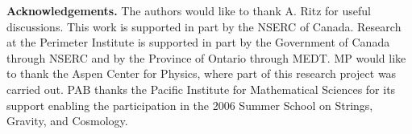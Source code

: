 \documentclass[12pt]{revtex4}
\begin{document}
{\bf Acknowledgements.} The authors would like to thank A. Ritz for useful discussions.
This work is supported in part by the NSERC of Canada. Research at the Perimeter Institute 
is supported in part by the Government
of Canada through NSERC and by the Province of Ontario through MEDT. MP would like to thank 
the Aspen Center for Physics, where part of this research project was carried out. 
PAB thanks the Pacific Institute for Mathematical Sciences for its support enabling the participation in the 2006 
Summer School on Strings, Gravity, and Cosmology.




\end{document}
